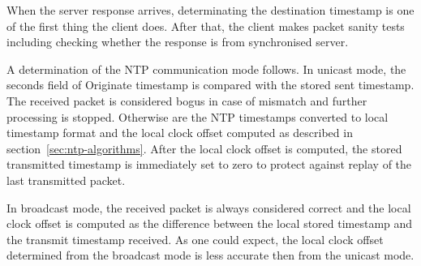 When the server response arrives,
determinating the destination timestamp is one of the first thing the client does.
After that, the client makes packet sanity tests including
checking whether the response is from synchronised server.

A determination of the NTP communication mode follows.
In unicast mode, the seconds field of Originate timestamp
is compared with the stored sent timestamp.
The received packet is considered bogus in case of mismatch and further processing is stopped.
Otherwise are the NTP timestamps converted to local timestamp format and
the local clock offset computed as described in section~\ref{sec:ntp-algorithms}.
After the local clock offset is computed,
the stored transmitted timestamp is immediately set to zero
to protect against replay of the last transmitted packet.

In broadcast mode, the received packet is always considered correct
and the local clock offset is computed as the difference between the local stored timestamp
and the transmit timestamp received.
As one could expect, the local clock offset determined from the broadcast mode
is less accurate then from the unicast mode.

